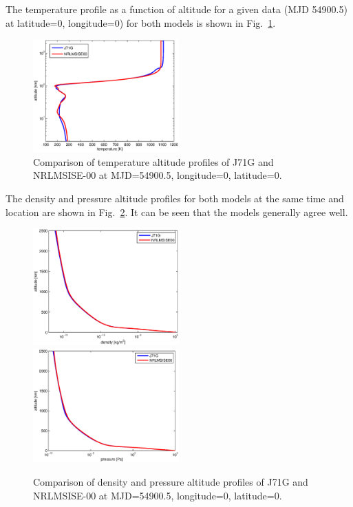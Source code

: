 \documentclass[a4paper]{article}
\begin{document}
The temperature profile as a function of altitude for a given data (MJD 54900.5) at latitude=0, longitude=0) for both models is shown in Fig.~\ref{fig:comp_t}.
\begin{figure}
\includegraphics[width=0.5\textwidth]{j71g_nrlmsise00_cmp1.eps}
\caption{Comparison of temperature altitude profiles of J71G and NRLMSISE-00 at MJD=54900.5, longitude=0, latitude=0.}
\label{fig:comp_t}
\end{figure}
The density and pressure altitude profiles for both models at the same time and location are shown in Fig.~\ref{fig:comp_dns_p}. It can be seen that the models generally agree well.
\begin{figure}
\includegraphics[width=0.5\textwidth]{j71g_nrlmsise00_cmp2.eps}
\includegraphics[width=0.5\textwidth]{j71g_nrlmsise00_cmp3.eps}
\caption{Comparison of density and pressure altitude profiles of J71G and NRLMSISE-00 at MJD=54900.5, longitude=0, latitude=0.}
\label{fig:comp_dns_p}
\end{figure}
\end{document}
